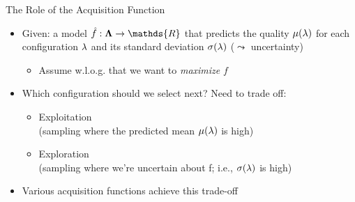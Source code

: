 \begin{frame}[c,fragile]{The Role of the Acquisition Function}
\begin{itemize}
  \item Given: a model $\hat{f}:\confs \rightarrow \mathds{R}$ that predicts the quality $\mu(\mathbf{\lambda})$ for each configuration $\mathbf{\lambda}$ and its standard deviation $\sigma(\mathbf{\lambda})$ ($\leadsto$ uncertainty)
  \begin{itemize}
  	\item Assume w.l.o.g. that we want to \emph{maximize} $f$
  \end{itemize}
  \medskip
  \pause
  \item Which configuration should we select next? Need to trade off: 
  \begin{itemize}
    \item \alert{Exploitation}\\(sampling where the predicted mean $\mu(\mathbf{\lambda})$ is high)
    \item \alert{Exploration}\\(sampling where we're uncertain about f; i.e., $\sigma(\mathbf{\lambda})$ is high)
  \end{itemize}
  \medskip
  \pause
  \item Various acquisition functions achieve this trade-off
\end{itemize}

\end{frame}


